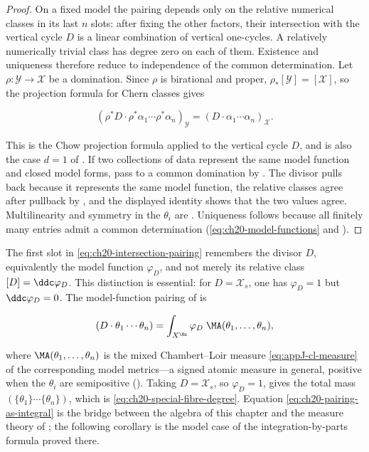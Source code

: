 \begin{proof}
On a fixed model the pairing depends only on the relative numerical
classes in its last $n$ slots: after fixing the other factors, their
intersection with the vertical cycle $D$ is a linear combination of
vertical one-cycles.  A relatively numerically trivial class has degree
zero on each of them.  Existence and uniqueness therefore reduce to
independence of the common determination.
Let $\rho:\mathcal Y\to\mathcal X$ be a domination.  Since $\rho$ is
birational and proper, $\rho_*[\mathcal Y]=[\mathcal X]$, so the
projection formula for Chern classes gives

\[
 (\rho^*D\cdot\rho^*\alpha_1\cdots\rho^*\alpha_n)_{\mathcal Y}
 =(D\cdot\alpha_1\cdots\alpha_n)_{\mathcal X}.
\]

This is the Chow projection formula  applied to
the vertical cycle $D$, and is also the case $d=1$ of
.  If two collections of data represent
the same model function and closed model forms, pass to a common domination
by .  The divisor pulls back because it
represents the same model function, the relative classes agree after
pullback by , and the displayed identity
shows that the two values agree.  Multilinearity and symmetry in the
$\theta_i$ are .  Uniqueness follows because
all finitely many entries admit a common determination
(\eqref{eq:ch20-model-functions} and
).
\end{proof}

The first slot in \eqref{eq:ch20-intersection-pairing} remembers the divisor
$D$, equivalently the model function $\varphi_D$, and not merely its
relative class $[D]=\ddc\varphi_D$.  This distinction is essential: for
$D=\mathcal X_s$, one has $\varphi_D=1$ but
$\ddc\varphi_D=0$.  The model-function pairing of
 is

\begin{equation}
\label{eq:ch20-pairing-as-integral}
 (D\cdot\theta_1\cdots\theta_n)
 =\int_{X^{\An}}\varphi_D\;\MA(\theta_1,\ldots,\theta_n),
\end{equation}

where $\MA(\theta_1,\ldots,\theta_n)$ is the mixed Chambert--Loir measure
\eqref{eq:appJ-cl-measure} of the corresponding model metrics---a signed
atomic measure in general, positive when the $\theta_i$ are semipositive
().  Taking $D=\mathcal X_s$, so
$\varphi_D=1$, gives the total mass
$(\{\theta_1\}\cdots\{\theta_n\})$, which is
\eqref{eq:ch20-special-fibre-degree}.  Equation
\eqref{eq:ch20-pairing-as-integral} is the bridge between the algebra of this
chapter and the measure theory of ; the following
corollary is the model case of the integration-by-parts formula
 proved there.

